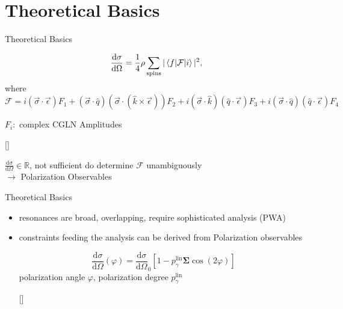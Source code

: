\documentclass[11pt,aspectratio=169,dvipsnames]{beamer}
\newcommand{\thecolor}{black!70!blue}
\begin{document}
\section{Theoretical Basics}
\begin{frame}{Theoretical Basics}
\begin{tcolorbox}[colback=blue!5,colframe=\thecolor,title=Unpolarized differential cross section]

		$$\frac{\text{d}\sigma}{\text{d}\Omega}=\frac{1}{4}\rho\sum_{\text{spins}}|\braket{f|\mathcal{F}|i}|^2\\,$$
		where
		$$\mathcal{F}=i(\vec{\sigma}\cdot\vec{\epsilon})F_1+(\vec{\sigma}\cdot\hat{q})(\vec{\sigma}\cdot(\hat{k}\times\vec{\epsilon}))F_2+i(\vec{\sigma}\cdot\hat{k})(\hat{q}\cdot\vec{\epsilon})F_3+i(\vec{\sigma}\cdot\hat{q})(\hat{q}\cdot\vec{\epsilon})F_4$$
		\begin{flushright}
			$F_i:$ complex CGLN Amplitudes
		\end{flushright}

	
	\begin{flushright}
		{\scriptsize[\cite{cgln}]}
	\end{flushright}
\end{tcolorbox}
$\frac{\text{d}\sigma}{\text{d}\Omega}\in\mathbb{R}$, not sufficient do determine $\mathcal{F}$ unambiguously\\
$\rightarrow$ Polarization Observables
\end{frame}
\begin{frame}{Theoretical Basics}
	\begin{itemize}
		\item resonances are broad, overlapping, require sophisticated analysis (PWA)
		\item constraints feeding the analysis can be derived from Polarization observables
		\begin{tcolorbox}[colback=blue!5,colframe=\thecolor,title=Beam asymmetry $\boldsymbol{\Sigma}$]
			$$\frac{\text{d}\sigma}{\text{d}\Omega}(\varphi)=\frac{\text{d}\sigma}{\text{d}\Omega}_0\left[1-p_\gamma^{\text{lin}}\boldsymbol{\Sigma}\cos(2\varphi)\right]$$
			polarization angle $\varphi$, polarization degree $p_\gamma^{\text{lin}}$
			\begin{flushright}
				{}
			\end{flushright}
		\end{tcolorbox}
	\end{itemize}
\end{frame}
\end{document}
